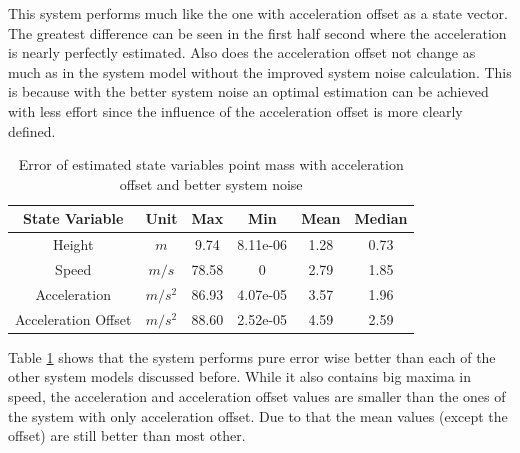 This system performs much like the one with acceleration offset as a state vector.
The greatest difference can be seen in the first half second where the acceleration is nearly perfectly estimated.
Also does the acceleration offset not change as much as in the system model without the improved system noise calculation.
This is because with the better system noise an optimal estimation can be achieved with less effort since the influence of the acceleration offset is more clearly defined.

\begin{table}[h!]
\centering
\begin{tabular}{cccccc}
\hline
\multicolumn{1}{|c|}{State Variable} & \multicolumn{1}{c|}{Unit} & \multicolumn{1}{c|}{Max} & \multicolumn{1}{c|}{Min} & \multicolumn{1}{c|}{Mean} & \multicolumn{1}{c|}{Median} \\ \hline
Height                            & $m$                         & 9.74	                  & 8.11e-06                 & 1.28                    & 0.73                      \\
Speed                             & $m/s$                       & 78.58                   & 0                        & 2.79                    & 1.85                      \\
Acceleration                       & $m/s^2$   			& 86.93                   & 4.07e-05                 & 3.57                    & 1.96                     \\
Acceleration Offset                & $m/s^2$   			& 88.60                   & 2.52e-05                 & 4.59                    & 2.59
\end{tabular}
\caption{Error of estimated state variables point mass with acceleration offset and better system noise}
\label{tab:ErrorPointMassBetterNoise}
\end{table}

Table \ref{tab:ErrorPointMassBetterNoise} shows that the system performs pure error wise better than each of the other system models discussed before.
While it also contains big maxima in speed, the acceleration and acceleration offset values are smaller than the ones of the system with only acceleration offset.
Due to that the mean values (except the offset) are still better than most other.

